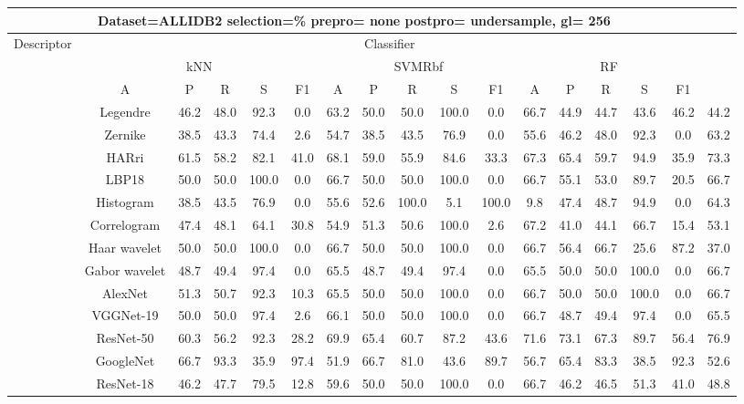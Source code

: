 \documentclass[12pt,italian]{article}
\begin{document}
\begin{tiny}
\begin{longtable}{lcccccccccccccccc}
\toprule
\multicolumn{16}{c}{Dataset=ALLIDB2 selection=\% prepro= none postpro= undersample, gl= 256} \\ 
\toprule
Descriptor & \multicolumn{15}{c}{Classifier} \\ 
& \multicolumn{5}{c}{kNN} & \multicolumn{5}{c}{SVMRbf} & \multicolumn{5}{c}{RF} \\ 
& A & P & R & S & F1 & A & P & R & S & F1 & A & P & R & S & F1 \\ 
\midrule
& Legendre & 46.2 & 48.0 & 92.3 &  0.0 & 63.2 & 50.0 & 50.0 & 100.0 &  0.0 & 66.7 & 44.9 & 44.7 & 43.6 & 46.2 & 44.2 \\ 
& Zernike & 38.5 & 43.3 & 74.4 &  2.6 & 54.7 & 38.5 & 43.5 & 76.9 &  0.0 & 55.6 & 46.2 & 48.0 & 92.3 &  0.0 & 63.2 \\ 
& HARri & 61.5 & 58.2 & 82.1 & 41.0 & 68.1 & 59.0 & 55.9 & 84.6 & 33.3 & 67.3 & 65.4 & 59.7 & 94.9 & 35.9 & 73.3 \\ 
& LBP18 & 50.0 & 50.0 & 100.0 &  0.0 & 66.7 & 50.0 & 50.0 & 100.0 &  0.0 & 66.7 & 55.1 & 53.0 & 89.7 & 20.5 & 66.7 \\ 
& Histogram & 38.5 & 43.5 & 76.9 &  0.0 & 55.6 & 52.6 & 100.0 &  5.1 & 100.0 &  9.8 & 47.4 & 48.7 & 94.9 &  0.0 & 64.3 \\ 
& Correlogram & 47.4 & 48.1 & 64.1 & 30.8 & 54.9 & 51.3 & 50.6 & 100.0 &  2.6 & 67.2 & 41.0 & 44.1 & 66.7 & 15.4 & 53.1 \\ 
& Haar wavelet & 50.0 & 50.0 & 100.0 &  0.0 & 66.7 & 50.0 & 50.0 & 100.0 &  0.0 & 66.7 & 56.4 & 66.7 & 25.6 & 87.2 & 37.0 \\ 
& Gabor wavelet & 48.7 & 49.4 & 97.4 &  0.0 & 65.5 & 48.7 & 49.4 & 97.4 &  0.0 & 65.5 & 50.0 & 50.0 & 100.0 &  0.0 & 66.7 \\ 
& AlexNet & 51.3 & 50.7 & 92.3 & 10.3 & 65.5 & 50.0 & 50.0 & 100.0 &  0.0 & 66.7 & 50.0 & 50.0 & 100.0 &  0.0 & 66.7 \\ 
& VGGNet-19 & 50.0 & 50.0 & 97.4 &  2.6 & 66.1 & 50.0 & 50.0 & 100.0 &  0.0 & 66.7 & 48.7 & 49.4 & 97.4 &  0.0 & 65.5 \\ 
& ResNet-50 & 60.3 & 56.2 & 92.3 & 28.2 & 69.9 & 65.4 & 60.7 & 87.2 & 43.6 & 71.6 & 73.1 & 67.3 & 89.7 & 56.4 & 76.9 \\ 
& GoogleNet & 66.7 & 93.3 & 35.9 & 97.4 & 51.9 & 66.7 & 81.0 & 43.6 & 89.7 & 56.7 & 65.4 & 83.3 & 38.5 & 92.3 & 52.6 \\ 
& ResNet-18 & 46.2 & 47.7 & 79.5 & 12.8 & 59.6 & 50.0 & 50.0 & 100.0 &  0.0 & 66.7 & 46.2 & 46.5 & 51.3 & 41.0 & 48.8 \\ 

\end{longtable}
\end{tiny}
\end{document}
